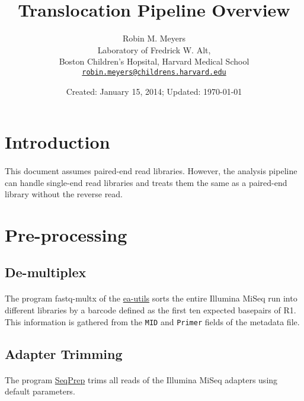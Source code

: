 \documentclass{article}
\begin{document}
\title{Translocation Pipeline Overview}
\author{Robin M. Meyers\\
  Laboratory of Fredrick W. Alt,\\
  Boston Children's Hopsital, Harvard Medical School\\
  \href{mailto:robin.meyers@childrens.harvard.edu}{\texttt{robin.meyers@childrens.harvard.edu}}}
\date{Created: January 15, 2014; Updated: \today}
\maketitle

\begin{abstract}

\end{abstract}


\section{Introduction}

\paragraph{} This document assumes paired-end read libraries. However, the analysis pipeline can handle single-end read libraries and treats them the same as a paired-end library without the reverse read.

\section{Pre-processing}
\subsection*{De-multiplex}
\paragraph{} The program fastq-multx of the \href{}{ea-utils} sorts the entire Illumina MiSeq run into different libraries by a barcode defined as the first ten expected basepairs of R1. This information is gathered from the \texttt{MID} and \texttt{Primer} fields of the metadata file.


\subsection*{Adapter Trimming}
\paragraph{} The program \href{}{SeqPrep} trims all reads of the Illumina MiSeq adapters using default parameters.
\end{document}
